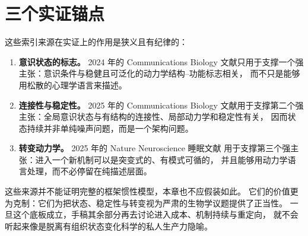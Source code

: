 \section{三个实证锚点}

这些索引来源在实证上的作用是狭义且有纪律的：
\begin{enumerate}[nosep]
  \item \textbf{意识状态的标志。} 2024 年的 Communications
        Biology 文献只用于支撑一个强主张：意识条件与稳健且可泛化的动力学结构--功能标志相关，
        而不只是能够用松散的心理学语言来描述。
  \item \textbf{连接性与稳定性。} 2025 年的 Communications Biology
        文献用于支撑第二个强主张：全局意识状态与有结构的连接性、局部动力学和稳定性有关，
        因而状态持续并非单纯噪声问题，而是一个架构问题。
  \item \textbf{转变动力学。} 2025 年的 Nature Neuroscience 睡眠文献
        用于支撑第三个强主张：进入一个新机制可以是突变式的、有模式可循的，
        并且能够用动力学语言处理，而不必停留在纯描述层面。
\end{enumerate}

\begin{discussion}
这些来源并不能证明完整的框架惯性模型，本章也不应假装如此。
它们的价值更为克制：它们为把状态、稳定性与转变视为严肃的生物学议题提供了正当性。
一旦这个底板成立，手稿其余部分再去讨论进入成本、机制持续与重定向，
就不会听起来像是脱离有组织状态变化科学的私人生产力隐喻。
\end{discussion}
